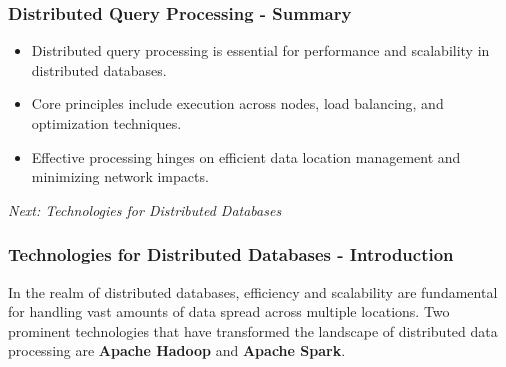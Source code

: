\documentclass[aspectratio=169]{beamer}
\begin{document}
\begin{frame}[fragile]
    \frametitle{Distributed Query Processing - Summary}
    \begin{itemize}
        \item Distributed query processing is essential for performance and scalability in distributed databases.
        \item Core principles include execution across nodes, load balancing, and optimization techniques.
        \item Effective processing hinges on efficient data location management and minimizing network impacts.
    \end{itemize}

    \textit{Next: Technologies for Distributed Databases}
\end{frame}

\begin{frame}[fragile]
  \frametitle{Technologies for Distributed Databases - Introduction}
  In the realm of distributed databases, efficiency and scalability are fundamental for handling vast amounts of data spread across multiple locations. Two prominent technologies that have transformed the landscape of distributed data processing are \textbf{Apache Hadoop} and \textbf{Apache Spark}.
\end{frame}
\end{document}
